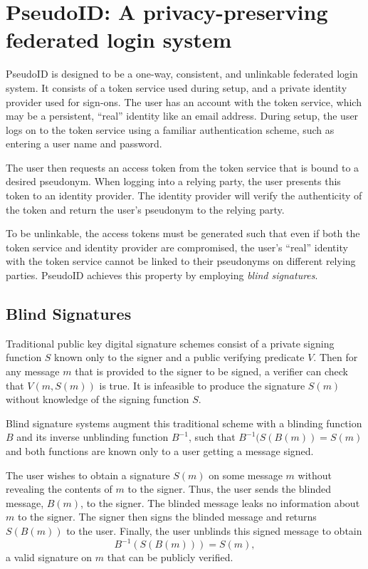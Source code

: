\documentclass{llncs}
\begin{document}
\section{PseudoID: A privacy-preserving federated login system}
\label{sec:pseudoid}

PseudoID is designed to be a one-way, consistent, and unlinkable
federated login system. It consists of a token service used during
setup, and a private identity provider used for sign-ons. The user has
an account with the token service, which may be a persistent, ``real''
identity like an email address. During setup, the user logs on to the
token service using a familiar authentication scheme, such as entering
a user name and password.

The user then requests an access token from the token service that is
bound to a desired pseudonym. When logging into a relying party, the
user presents this token to an identity provider. The identity
provider will verify the authenticity of the token and return the
user's pseudonym to the relying party.

To be unlinkable, the access tokens must be generated such that even
if both the token service and identity provider are compromised, the
user's ``real'' identity with the token service cannot be linked to
their pseudonyms on different relying parties. PseudoID achieves this
property by employing \textit{blind signatures}.

\subsection{Blind Signatures}
\label{section:blind-sigs}

Traditional public key digital signature schemes \cite{DH76} consist
of a private signing function $S$ known only to the signer and a
public verifying predicate $V$. Then for any message $m$ that is
provided to the signer to be signed, a verifier can check that $V(m,
S(m))$ is true. It is infeasible to produce the signature $S(m)$
without knowledge of the signing function $S$.

Blind signature systems \cite{Cha82} augment this traditional scheme
with a blinding function $B$ and its inverse unblinding function
$B^{-1}$, such that $B^{-1}(S(B(m)) = S(m)$ and both
functions are known only to a user getting a message signed.

The user wishes to obtain a signature $S(m)$ on some message
$m$ without revealing the contents of $m$ to the signer. Thus, the
user sends the blinded message, $B(m)$, to the signer. The blinded
message leaks no information about $m$ to the signer. The signer then
signs the blinded message and returns $S(B(m))$ to the
user. Finally, the user unblinds this signed message to
obtain $$B^{-1}(S(B(m))) = S(m),$$ a valid signature on $m$
that can be publicly verified.
\end{document}
